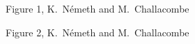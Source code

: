 \twolinestyle{\documentclass[prb,preprint]{revtex4}}
\begin{document}
{\begin{center}
Figure 1, K.~N\'emeth and M.~Challacombe \\[1.cm]
\end{center}

\clearpage

\begin{center}
Figure 2, K.~N\'emeth and M.~Challacombe \\[1.cm]
\end{center}

\clearpage

}
\end{document}
